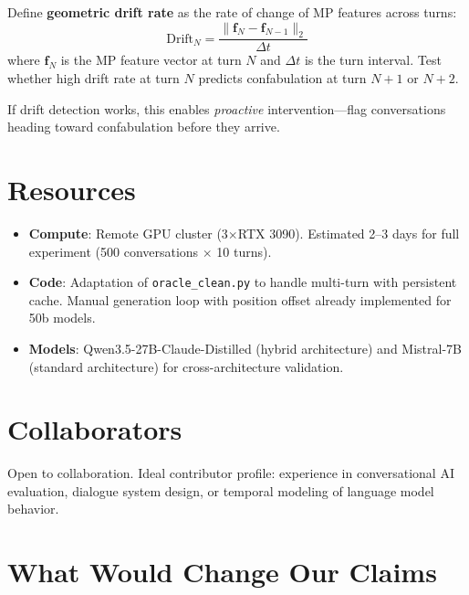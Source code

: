 \documentclass[11pt,letterpaper]{article}
\begin{document}
Define \textbf{geometric drift rate} as the rate of change of MP
features across turns:
\[
  \text{Drift}_N = \frac{\|\mathbf{f}_{N} - \mathbf{f}_{N-1}\|_2}{\Delta t}
\]
where $\mathbf{f}_N$ is the MP feature vector at turn $N$ and
$\Delta t$ is the turn interval. Test whether high drift rate at turn
$N$ predicts confabulation at turn $N+1$ or $N+2$.

If drift detection works, this enables \emph{proactive}
intervention---flag conversations heading toward confabulation before
they arrive.

\section{Resources}

\begin{itemize}
  \item \textbf{Compute}: Remote GPU cluster (3$\times$RTX 3090). Estimated 2--3
    days for full experiment (500 conversations $\times$ 10 turns).
  \item \textbf{Code}: Adaptation of \texttt{oracle\_clean.py} to
    handle multi-turn with persistent cache. Manual generation loop
    with position offset already implemented for 50b models.
  \item \textbf{Models}: Qwen3.5-27B-Claude-Distilled (hybrid
    architecture) and Mistral-7B (standard architecture) for
    cross-architecture validation.
\end{itemize}

\section{Collaborators}

Open to collaboration. Ideal contributor profile: experience in
conversational AI evaluation, dialogue system design, or temporal
modeling of language model behavior.

\section{What Would Change Our Claims}
\end{document}
